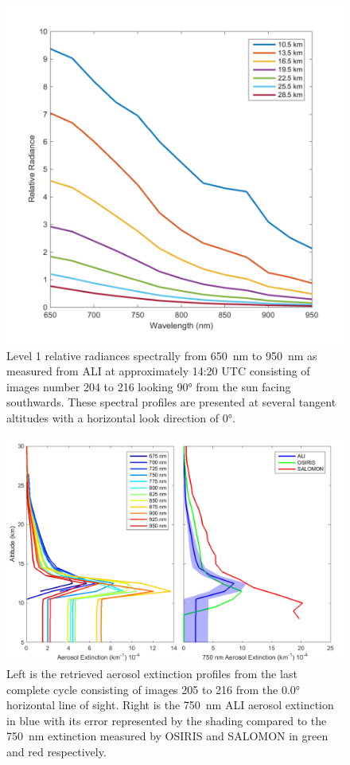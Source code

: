 \documentclass[12pt]{article}
\begin{document}
\begin{figure}
\includegraphics[width=1.0\textwidth]{./Images/5-2-AliSpectralRadiances.pdf}
    \caption{Level 1 relative radiances spectrally from 650~nm to 950~nm as measured from ALI at approximately 14:20 UTC consisting of images number 204 to 216 looking 90\si{\degree} from the sun facing southwards. These spectral profiles are presented at several tangent altitudes with a horizontal look direction of 0\si{\degree}.}
    \label{fig:AliSpectralRadiances}
\end{figure}

\newpage

\begin{figure}
\includegraphics[width=1.0\textwidth]{./Images/5-3-FullAerosolCycleComparison.pdf}
    \caption{Left is the retrieved aerosol extinction profiles from the last complete cycle consisting of images 205 to 216 from the 0.0\si{\degree} horizontal line of sight. Right is the 750~nm ALI aerosol extinction in blue with its error represented by the shading compared to the 750~nm extinction measured by OSIRIS and SALOMON in green and red respectively.}
    \label{fig:AliAerosolCycle}
\end{figure}
\end{document}
